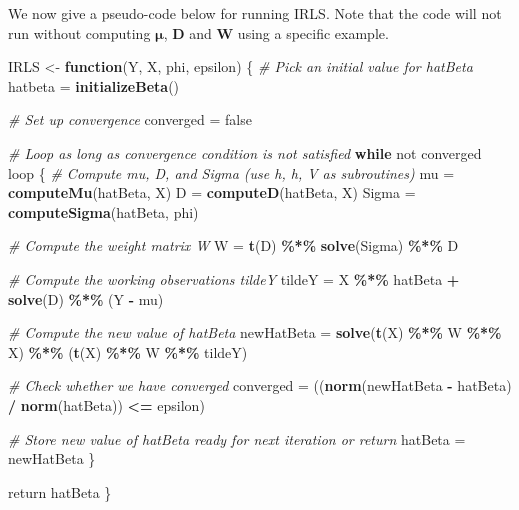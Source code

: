 \documentclass[
  12pt,
]{book}
\newenvironment{Shaded}{\begin{snugshade}}{\end{snugshade}}
\newcommand{\CommentTok}[1]{\textcolor[rgb]{0.56,0.35,0.01}{\textit{#1}}}
\newcommand{\ControlFlowTok}[1]{\textcolor[rgb]{0.13,0.29,0.53}{\textbf{#1}}}
\newcommand{\FunctionTok}[1]{\textcolor[rgb]{0.13,0.29,0.53}{\textbf{#1}}}
\newcommand{\NormalTok}[1]{#1}
\newcommand{\OtherTok}[1]{\textcolor[rgb]{0.56,0.35,0.01}{#1}}
\newcommand{\SpecialCharTok}[1]{\textcolor[rgb]{0.81,0.36,0.00}{\textbf{#1}}}
\begin{document}
We now give a pseudo-code below for running IRLS. Note that the code will not run without computing \(\boldsymbol{\mu}\), \(\boldsymbol{D}\) and \(\boldsymbol{W}\) using a specific example.

\begin{Shaded}
\begin{Highlighting}[]
\NormalTok{IRLS }\OtherTok{\textless{}{-}} \ControlFlowTok{function}\NormalTok{(Y, X, phi, epsilon) \{}
    \CommentTok{\# Pick an initial value for hatBeta}
\NormalTok{    hatbeta }\OtherTok{=} \FunctionTok{initializeBeta}\NormalTok{()}

    \CommentTok{\# Set up convergence}
\NormalTok{    converged }\OtherTok{=}\NormalTok{ false}

    \CommentTok{\# Loop as long as convergence condition is not satisfied}
    \ControlFlowTok{while}\NormalTok{ not converged loop}
\NormalTok{    \{}
        \CommentTok{\# Compute mu, D, and Sigma (use h, h\textquotesingle{}, V as subroutines)}
\NormalTok{        mu }\OtherTok{=} \FunctionTok{computeMu}\NormalTok{(hatBeta, X)}
\NormalTok{        D }\OtherTok{=} \FunctionTok{computeD}\NormalTok{(hatBeta, X)}
\NormalTok{        Sigma }\OtherTok{=} \FunctionTok{computeSigma}\NormalTok{(hatBeta, phi)}

        \CommentTok{\# Compute the weight matrix W}
\NormalTok{        W }\OtherTok{=} \FunctionTok{t}\NormalTok{(D) }\SpecialCharTok{\%*\%} \FunctionTok{solve}\NormalTok{(Sigma) }\SpecialCharTok{\%*\%}\NormalTok{ D}

        \CommentTok{\# Compute the working observations tildeY}
\NormalTok{        tildeY }\OtherTok{=}\NormalTok{ X }\SpecialCharTok{\%*\%}\NormalTok{ hatBeta }\SpecialCharTok{+} \FunctionTok{solve}\NormalTok{(D) }\SpecialCharTok{\%*\%}\NormalTok{ (Y }\SpecialCharTok{{-}}\NormalTok{ mu)}

        \CommentTok{\# Compute the new value of hatBeta}
\NormalTok{        newHatBeta }\OtherTok{=} \FunctionTok{solve}\NormalTok{(}\FunctionTok{t}\NormalTok{(X) }\SpecialCharTok{\%*\%}\NormalTok{ W }\SpecialCharTok{\%*\%}\NormalTok{ X) }\SpecialCharTok{\%*\%}\NormalTok{ (}\FunctionTok{t}\NormalTok{(X) }\SpecialCharTok{\%*\%}\NormalTok{ W }\SpecialCharTok{\%*\%}\NormalTok{ tildeY)}

        \CommentTok{\# Check whether we have converged}
\NormalTok{        converged }\OtherTok{=}\NormalTok{ ((}\FunctionTok{norm}\NormalTok{(newHatBeta }\SpecialCharTok{{-}}\NormalTok{ hatBeta) }\SpecialCharTok{/} \FunctionTok{norm}\NormalTok{(hatBeta)) }\SpecialCharTok{\textless{}=}\NormalTok{ epsilon)}

        \CommentTok{\# Store new value of hatBeta ready for next iteration or return}
\NormalTok{        hatBeta }\OtherTok{=}\NormalTok{ newHatBeta}
\NormalTok{    \}}

\NormalTok{    return hatBeta}
\NormalTok{\}}
\end{Highlighting}
\end{Shaded}
\end{document}
